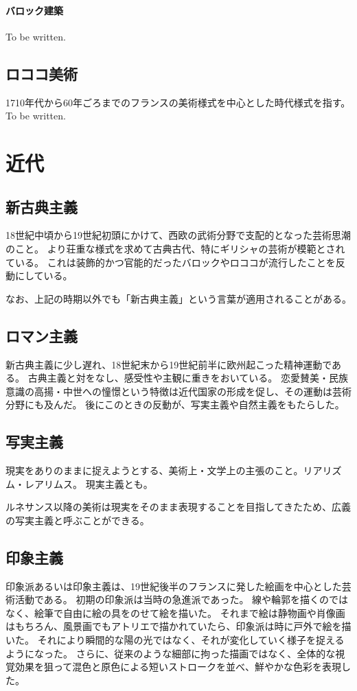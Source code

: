 \documentclass[letterpaper,10pt,dvipdfmx]{sphinxmanual}
\begin{document}
\paragraph{バロック建築}
\label{\detokenize{Baroque:id4}}
To be written.


\subsection{ロココ美術}
\label{\detokenize{category:id21}}
1710年代から60年ごろまでのフランスの美術様式を中心とした時代様式を指す。
To be written.


\section{近代}
\label{\detokenize{category:id22}}

\subsection{新古典主義}
\label{\detokenize{category:id23}}
18世紀中頃から19世紀初頭にかけて、西欧の武術分野で支配的となった芸術思潮のこと。
より荘重な様式を求めて古典古代、特にギリシャの芸術が模範とされている。
これは装飾的かつ官能的だったバロックやロココが流行したことを反動にしている。

なお、上記の時期以外でも「新古典主義」という言葉が適用されることがある。


\subsection{ロマン主義}
\label{\detokenize{category:id24}}
新古典主義に少し遅れ、18世紀末から19世紀前半に欧州起こった精神運動である。
古典主義と対をなし、感受性や主観に重きをおいている。
恋愛賛美・民族意識の高揚・中世への憧憬という特徴は近代国家の形成を促し、その運動は芸術分野にも及んだ。
後にこのときの反動が、写実主義や自然主義をもたらした。


\subsection{写実主義}
\label{\detokenize{category:id25}}
現実をありのままに捉えようとする、美術上・文学上の主張のこと。リアリズム・レアリムス。
現実主義とも。

ルネサンス以降の美術は現実をそのまま表現することを目指してきたため、広義の写実主義と呼ぶことができる。


\subsection{印象主義}
\label{\detokenize{category:id26}}
印象派あるいは印象主義は、19世紀後半のフランスに発した絵画を中心とした芸術活動である。
初期の印象派は当時の急進派であった。
線や輪郭を描くのではなく、絵筆で自由に絵の具をのせて絵を描いた。
それまで絵は静物画や肖像画はもちろん、風景画でもアトリエで描かれていたら、印象派は時に戸外で絵を描いた。
それにより瞬間的な陽の光ではなく、それが変化していく様子を捉えるようになった。
さらに、従来のような細部に拘った描画ではなく、全体的な視覚効果を狙って混色と原色による短いストロークを並べ、鮮やかな色彩を表現した。
\end{document}
